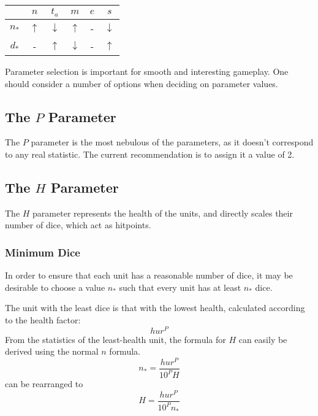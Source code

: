 \begin{table}
\begin{tabular}{c|c|c|c|c|c}
            &   $n$             &   $t_a$           &   $m$             &   $e$             &   $s$             \\
    \hline
    $n_*$   &   $\uparrow$      &   $\downarrow$    &   $\uparrow$      &   -               &   $\downarrow$    \\
    $d_*$   &   -               &   $\uparrow$      &   $\downarrow$    &   -               &   $\uparrow$      \\
\end{tabular}
\end{table}

Parameter selection is important for smooth and interesting gameplay.
One should consider a number of options when deciding on parameter values.

\subsection{The $P$ Parameter}

The $P$ parameter is the most nebulous of the parameters,
as it doesn't correspond to any real statistic.
The current recommendation is to assign it a value of 2.

\subsection{The $H$ Parameter}

The $H$ parameter represents the health of the units,
and directly scales their number of dice, which act as hitpoints.

\subsubsection{Minimum Dice}

In order to ensure that each unit has a reasonable number of dice,
it may be desirable to choose a value $n_*$
such that every unit has at least $n_*$ dice.

The unit with the least dice is that with the lowest health,
calculated according to the health factor:
\[
    h u r^P
\]
From the statistics of the least-health unit, the formula for $H$
can easily be derived using the normal $n$ formula.
\[
    n_* =
        \frac
            {h u r^P}
            {10^P H}
\]
can be rearranged to
\[
    H =
        \frac
            {h u r^P}
            {10^P n_*}
\]

